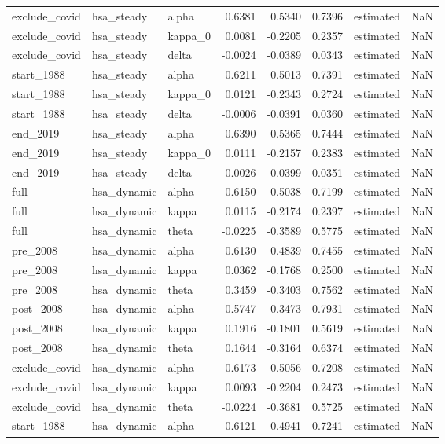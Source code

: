 \begin{tabular}{lllrrrlr}
exclude\_covid & hsa\_steady & alpha & 0.6381 & 0.5340 & 0.7396 & estimated & NaN \\
exclude\_covid & hsa\_steady & kappa\_0 & 0.0081 & -0.2205 & 0.2357 & estimated & NaN \\
exclude\_covid & hsa\_steady & delta & -0.0024 & -0.0389 & 0.0343 & estimated & NaN \\
start\_1988 & hsa\_steady & alpha & 0.6211 & 0.5013 & 0.7391 & estimated & NaN \\
start\_1988 & hsa\_steady & kappa\_0 & 0.0121 & -0.2343 & 0.2724 & estimated & NaN \\
start\_1988 & hsa\_steady & delta & -0.0006 & -0.0391 & 0.0360 & estimated & NaN \\
end\_2019 & hsa\_steady & alpha & 0.6390 & 0.5365 & 0.7444 & estimated & NaN \\
end\_2019 & hsa\_steady & kappa\_0 & 0.0111 & -0.2157 & 0.2383 & estimated & NaN \\
end\_2019 & hsa\_steady & delta & -0.0026 & -0.0399 & 0.0351 & estimated & NaN \\
full & hsa\_dynamic & alpha & 0.6150 & 0.5038 & 0.7199 & estimated & NaN \\
full & hsa\_dynamic & kappa & 0.0115 & -0.2174 & 0.2397 & estimated & NaN \\
full & hsa\_dynamic & theta & -0.0225 & -0.3589 & 0.5775 & estimated & NaN \\
pre\_2008 & hsa\_dynamic & alpha & 0.6130 & 0.4839 & 0.7455 & estimated & NaN \\
pre\_2008 & hsa\_dynamic & kappa & 0.0362 & -0.1768 & 0.2500 & estimated & NaN \\
pre\_2008 & hsa\_dynamic & theta & 0.3459 & -0.3403 & 0.7562 & estimated & NaN \\
post\_2008 & hsa\_dynamic & alpha & 0.5747 & 0.3473 & 0.7931 & estimated & NaN \\
post\_2008 & hsa\_dynamic & kappa & 0.1916 & -0.1801 & 0.5619 & estimated & NaN \\
post\_2008 & hsa\_dynamic & theta & 0.1644 & -0.3164 & 0.6374 & estimated & NaN \\
exclude\_covid & hsa\_dynamic & alpha & 0.6173 & 0.5056 & 0.7208 & estimated & NaN \\
exclude\_covid & hsa\_dynamic & kappa & 0.0093 & -0.2204 & 0.2473 & estimated & NaN \\
exclude\_covid & hsa\_dynamic & theta & -0.0224 & -0.3681 & 0.5725 & estimated & NaN \\
start\_1988 & hsa\_dynamic & alpha & 0.6121 & 0.4941 & 0.7241 & estimated & NaN \\

\end{tabular}
